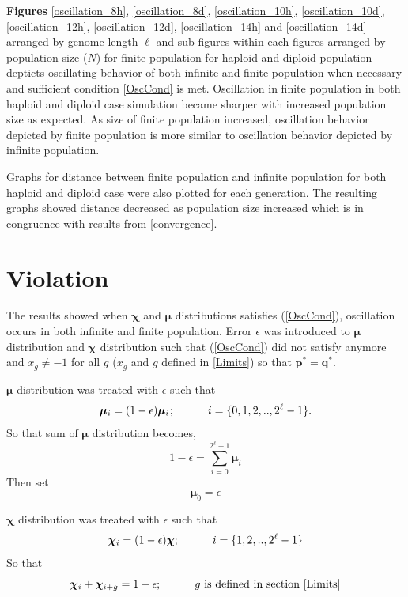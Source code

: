 


\textbf{ Figures} \ref{oscillation_8h}, \ref{oscillation_8d}, \ref{oscillation_10h}, \ref{oscillation_10d}, \ref{oscillation_12h}, \ref{oscillation_12d}, 
\ref{oscillation_14h} and \ref{oscillation_14d} arranged by genome length $\ell$ 
and sub-figures within each figures arranged by population size ($N$) for finite population for haploid and diploid population 
depticts oscillating behavior of both infinite and finite population when necessary and sufficient condition \ref{OscCond} is met. 
Oscillation in finite population in both haploid and diploid case simulation became sharper with increased population size as expected. 
As size of finite population increased, oscillation behavior depicted by finite population is more similar to oscillation behavior depicted by infinite population. 

Graphs for distance between finite population and infinite population for both haploid and diploid case were also plotted for each generation. 
The resulting graphs showed distance decreased as population size increased which is in congruence with results from \ref{convergence}. 





\newpage

\section{Violation}

The results showed when $\bm{\chi}$ and $\bm{\mu}$ distributions satisfies (\ref{OscCond}), oscillation occurs in both infinite and finite population. 
Error $\epsilon$ was introduced to $\bm{\mu}$ distribution and $\bm{\chi}$ distribution such that (\ref{OscCond}) did not satisfy anymore and 
$x_g \neq −1$ for all $g$ ($x_g$ and $g$ defined in \ref{Limits}) so that $\bm{p}^\ast = \bm{q}^\ast$.

$\bm{\mu}$ distribution was treated with $\epsilon$ such that
\[
\bm{\mu}_i = (1-\epsilon) \bm{\mu}_i \hspace{0.01in}; \hspace{30pt} i = \{0, 1, 2,.., 2^{\ell}-1\}.
\]
So that sum of $\bm{\mu}$ distribution becomes, 
\[
1-\epsilon = \sum \limits_{i=0}^{2^{\ell}-1} \bm{\mu}_i
\]
Then set
\[
\bm{\mu}_0 = \epsilon
\]

$\bm{\chi}$ distribution was treated with $\epsilon$ such that
\[
\bm{\chi}_i = (1-\epsilon) \bm{\chi} ; \hspace{30pt} i = \{1, 2,.., 2^{\ell}-1\} 
\]
So that 
\[
\bm{\chi}_i + \bm{\chi}_{i+g} = 1-\epsilon ; \hspace{30pt} g \text{ is defined in  section } \ref{Limits}
\]

